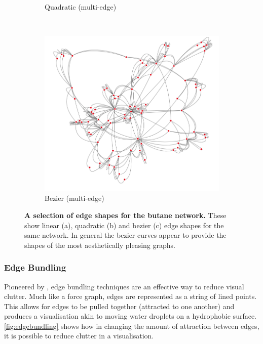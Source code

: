 \begin{figure}[H]
\begin{subfigure}[b]{.292\textheight}
     \caption{Quadratic (multi-edge)}
     \end{subfigure}\\
     \begin{subfigure}[b]{.292\textheight}
         \centering
     \includegraphics[width=\textwidth]{figures_c1/edgetype/multibeziergray.png}
     \caption{Bezier (multi-edge)}
     \end{subfigure}
        \caption{\textbf{A selection of edge shapes for the butane network.} These show linear (a), quadratic (b) and bezier (c) edge shapes for the same network. In general the bezier curves appear to provide the shapes of the most aesthetically pleasing graphs.       }
      \label{fig:curvededge}
\end{figure}








\subsubsection{Edge Bundling }
Pioneered by \cite{bundlepioneer}, edge bundling techniques are an effective way to reduce visual clutter. Much like a force graph, edges are represented as a string of lined points. This allows for edges to be pulled together (attracted to one another) and produces a visualisation akin to moving water droplets on a hydrophobic surface. \autoref{fig:edgebundling} shows how in changing the amount of attraction between edges, it is possible to reduce clutter in a visualisation. 


